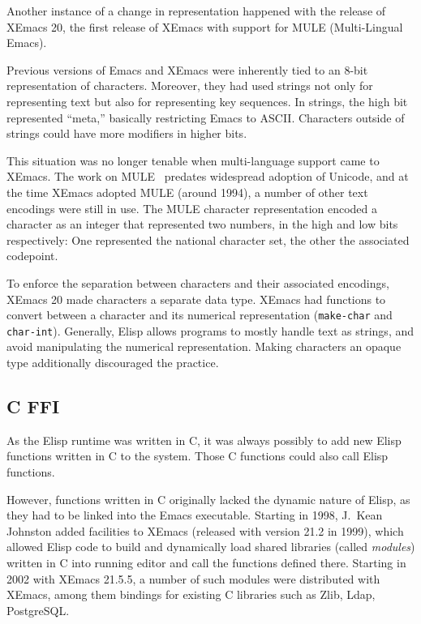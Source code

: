 \documentclass[format=acmsmall, review=false, screen=true]{acmart}
\newcommand \Elisp {Elisp}
\begin{document}
Another instance of a change in representation happened with the
release of XEmacs 20, the first release of XEmacs with support for
MULE (Multi-Lingual Emacs).

Previous versions of Emacs and XEmacs were inherently tied to an 8-bit
representation of characters.  Moreover, they had used strings not
only for representing text but also for representing key sequences.
In strings, the high bit represented ``meta,'' basically restricting
Emacs to ASCII.  Characters outside of strings could have more
modifiers in higher bits.

This situation was no longer tenable when multi-language support came
to XEmacs.  The work on MULE~\cite{Ohmaki2002} predates widespread
adoption of Unicode, and at the time XEmacs adopted MULE (around
1994), a number of other text encodings were still in use.  The MULE
character representation encoded a character as an integer that
represented two numbers, in the high and low bits respectively: One
represented the national character set, the other the associated
codepoint.

To enforce the separation between characters and their associated
encodings, XEmacs 20 made characters a separate data type.  XEmacs had
functions to convert between a character and its numerical
representation (\texttt{make-char} and \texttt{char-int}).  Generally,
\Elisp{} allows programs to mostly handle text as strings,
and avoid manipulating the numerical representation.  Making
characters an opaque type additionally discouraged the practice.

\subsection{C FFI}

As the \Elisp{} runtime was written in C, it was always possibly to
add new \Elisp{} functions written in C to the system.  Those C
functions could also call \Elisp{} functions.

However, functions written in C originally lacked the dynamic nature
of \Elisp{}, as they had to be linked into the Emacs executable.
Starting in 1998, J.\ Kean Johnston added facilities to XEmacs
(released with version 21.2 in 1999), which allowed \Elisp{} code to
build and dynamically load shared libraries (called \textit{modules})
written in C into running editor and call the functions defined
there.  Starting in 2002 with XEmacs 21.5.5, a number of such modules
were distributed with XEmacs, among them bindings for existing C
libraries such as Zlib, Ldap, PostgreSQL.
\end{document}
